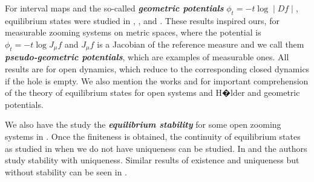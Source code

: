 \documentclass[12pt,a4paper]{amsart}
\theoremstyle{plain}
\begin{document}
For interval maps and the so-called \textbf{\textit{geometric potentials}} $\phi_{t} = -t\log \mid Df \mid$, equilibrium states were studied in  \cite{BT}, \cite{IT1}, \cite{IT2} and \cite{PS}. These results inspired ours, for measurable zooming systems on metric spaces, where the potential is $\phi_{t} = -t\log J_{\mu}f$ and $J_{\mu}f$ is a Jacobian of the reference measure and we call them \textbf{\textit{pseudo-geometric potentials}}, which are examples of measurable ones. All results are for open dynamics, which reduce to the corresponding closed dynamics if the hole is empty. We also mention the works \cite{DT2} and \cite{PU} for important comprehension of the theory of equilibrium states for open systems and H�lder and geometric potentials. 

%

We also have the study the \textbf{\textit{equilibrium stability}} for some open zooming systems in \cite{BiS}. Once the finiteness is obtained, the continuity of equilibrium states as studied in \cite{Ar} when we do not have uniqueness can be studied. In \cite{ARS} and \cite{BR} the authors study stability with uniqueness. Similar results of existence and uniqueness but  without stability can be seen in \cite{SSV}.
\end{document}
